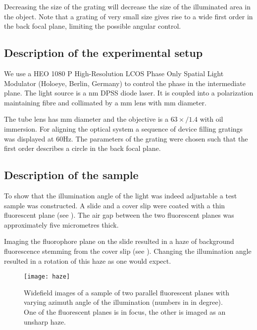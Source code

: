 Decreasing the size of the grating will decrease the size of the
illuminated area in the object. Note that a grating of very small size
gives rise to a wide first order in the back focal plane, limiting the
possible angular control.
\subsection{Description of the experimental setup}
We use a HEO 1080 P High-Resolution LCOS Phase Only Spatial Light
Modulator (Holoeye, Berlin, Germany) to control the phase in the
intermediate plane. The light source is a \unit[473]{nm} DPSS diode
laser. It is coupled into a polarization maintaining fibre and
collimated by a \unit[150]{mm} lens with \unit[50]{mm} diameter.

The tube lens has \unit[300]{mm} diameter and the objective is a
$63\times/1.4$ with oil immersion.  For aligning the optical system a
sequence of device filling gratings was displayed at 60Hz. The
parameters of the grating were chosen such that the first order
describes a circle in the back focal plane.

\subsection{Description of the sample}
To show that the illumination angle of the light was indeed adjustable
a test sample was constructed. A slide and a cover slip were coated
with a thin fluorescent plane (see ). The air
gap between the two fluorescent planes was approximately five
micrometres thick.

Imaging the fluorophore plane on the slide resulted in a haze of
background fluorescence stemming from the cover slip (see
). Changing the illumination angle resulted in a
rotation of this haze as one would expect.
\begin{figure}
  \centering
  \texttt{[image: haze]}
  \caption{Widefield images of a sample of two parallel fluorescent
    planes with varying azimuth angle of the illumination (numbers in
    in degree). One of the fluorescent planes is in focus, the other
    is imaged as an unsharp haze.}
  \label{fig:holo-meas}
\end{figure}


